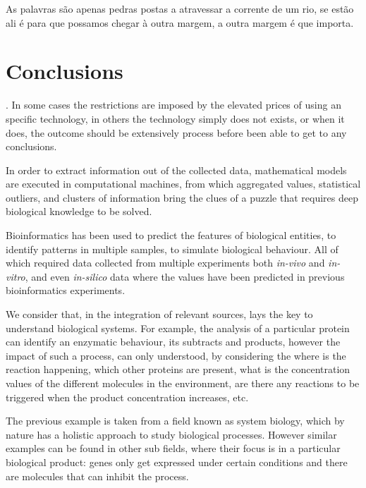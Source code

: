 \begin{savequote}[75mm] 
As palavras são apenas pedras postas a atravessar a corrente de um rio, se estão ali é para que possamos chegar à outra margem, a outra margem é que importa.
\end{savequote}

\chapter{Conclusions}

. In some cases the restrictions are imposed by the elevated prices of using an specific technology, in others the technology simply does not exists, or when it does, the outcome should be extensively process before been able to get to any conclusions. 

In order to extract information out of the collected data, mathematical models are executed in computational machines, from which aggregated values, statistical outliers, and clusters of information bring the clues of a puzzle that requires deep biological knowledge to be solved.

Bioinformatics has been used to predict the features of biological entities, to identify patterns in multiple samples, to simulate biological behaviour. All of which required data collected from multiple experiments both \emph{in-vivo} and \emph{in-vitro}, and even \emph{in-silico} data where the values have been predicted in previous bioinformatics experiments.

We consider that, in the integration of relevant sources, lays the key to understand biological systems. For example,  the analysis of a particular protein can identify an enzymatic behaviour, its subtracts and products, however the impact of such a process, can only understood, by considering the where is the reaction happening, which other proteins are present, what is the concentration values of the different molecules in the environment, are there any reactions to be triggered when the product concentration increases, etc.

The previous example is taken from a field known as system biology, which by nature has a holistic approach to study biological processes. However similar examples can be found in other sub fields, where their focus is in a particular biological product: genes only get expressed under certain conditions and there are molecules that can inhibit the process.


